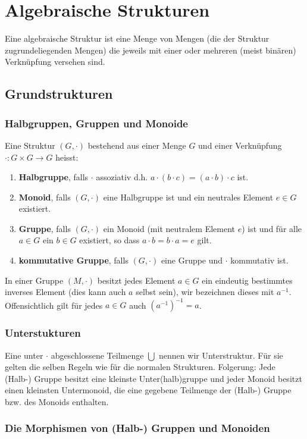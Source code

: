\chapter{Algebraische Strukturen}
Eine algebraische Struktur ist eine Menge von Mengen (die der Struktur zugrundeliegenden Mengen) die jeweils mit einer oder mehreren (meist binären) Verknüpfung versehen sind.
\section{Grundstrukturen}
\subsection{Halbgruppen, Gruppen und Monoide}
\begin{definition}
Eine Struktur $(G, \cdot)$ bestehend aus einer Menge $G$ und einer Verknüpfung $\cdot : G \times G \rightarrow G$ heisst:
\begin{enumerate}
	\item \textbf{Halbgruppe}, falls $\cdot$ assoziativ d.h. $a \cdot ( b \cdot c) = (a \cdot b) \cdot c$ ist.
	\item \textbf{Monoid}, falls $(G, \cdot)$ eine Halbgruppe ist und ein neutrales Element $e \in G$ existiert.
	\item \textbf{Gruppe}, falls $(G, \cdot)$ ein Monoid (mit neutralem Element $e$) ist und für alle $a \in G$ ein $b \in G$ existiert, so dass $a \cdot b = b \cdot a = e$ gilt.
	\item \textbf{kommutative Gruppe}, falls $(G, \cdot)$ eine Gruppe und $\cdot$ kommutativ ist.
\end{enumerate}
\end{definition}

\begin{bem}
In einer Gruppe $(M, \cdot)$ besitzt jedes Element $a \in G$ ein eindeutig bestimmtes inverses Element (dies kann auch $a$ selbst sein), wir bezeichnen dieses mit $a^{-1}$. Offensichtlich gilt für jedes $a \in G$ auch $(a^{-1})^{-1} = a$.
\end{bem}

\subsection{Unterstukturen}
Eine unter $\cdot$ abgeschlossene Teilmenge $\bigcup$ nennen wir Unterstruktur. Für sie gelten die selben Regeln wie für die normalen Strukturen. Folgerung: Jede (Halb-) Gruppe besitzt eine kleinste Unter(halb)gruppe und jeder Monoid besitzt einen kleinsten Untermonoid, die eine gegebene Teilmenge der (Halb-) Gruppe bzw. des Monoids enthalten.

\subsection{Die Morphismen von (Halb-) Gruppen und Monoiden}
